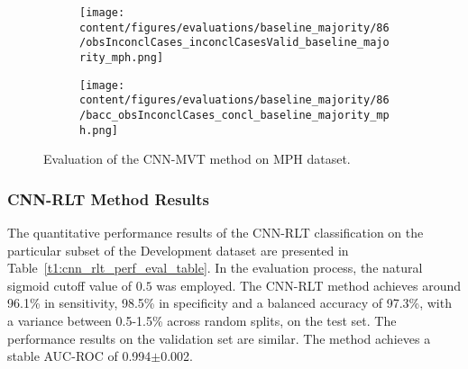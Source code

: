 \begin{figure}[ht]
  \begin{subfigure}{0.9\textwidth}
    \centering
    \texttt{[image: content/figures/evaluations/baseline\_majority/86/obsInconclCases\_inconclCasesValid\_baseline\_majority\_mph.png]}
    \label{fig:obsInconclCases_inconclCasesValid_baseline_majority_mph}
  \end{subfigure}
  \hfill
  \begin{subfigure}{0.9\textwidth}
    \centering
    \texttt{[image: content/figures/evaluations/baseline\_majority/86/bacc\_obsInconclCases\_concl\_baseline\_majority\_mph.png]}
    \label{fig:bacc_obsInconclCases_concl_baseline_majority_mph}
  \end{subfigure}
  \caption{Evaluation of the CNN-MVT method on MPH dataset.}
  \label{fig:perf_results_mvt_mph}
\end{figure}


\subsubsection{CNN-RLT Method Results}
\label{subsubsec:eval_rlt}




The quantitative performance results of the CNN-RLT classification on the 
particular subset of the Development dataset are presented in Table~\ref{t1:cnn_rlt_perf_eval_table}.
In the evaluation process, the natural sigmoid cutoff value of $0.5$ was employed.
The CNN-RLT method achieves around 96.1\% in sensitivity, 98.5\% in specificity and a balanced accuracy of 97.3\%, 
with a variance between 0.5-1.5\% across random splits, on the test set.
The performance results on the validation set are similar.
The method achieves a stable AUC-ROC of 0.994$\pm$0.002.


